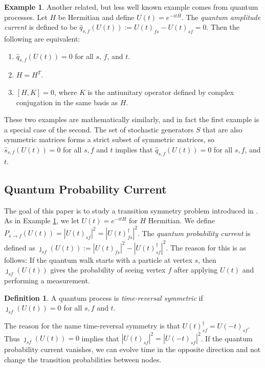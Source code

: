 \documentclass[twocolumn,superscriptaddress]{revtex4-1}
\theoremstyle{plain}
\theoremstyle{definition}
\newtheorem{defn}[theorem]{Definition}%
\theoremstyle{definition}
\theoremstyle{definition}
\theoremstyle{definition}
\newtheorem{example}[theorem]{Example}
\theoremstyle{definition}
\theoremstyle{definition}
\begin{document}
\begin{example}\label{ex:quantamp}
 Another related, but less well known example comes from quantum processes. Let $H$ be Hermitian and define $U(t)=e^{-itH}$. The \emph{quantum amplitude current} is defined to be $\hat{q}_{s,f}(U(t)):=U(t)_{fs}-U(t)_{sf}=0$. Then the following are equivalent:
 \begin{enumerate}
  \item $\hat{q}_{s,f}(U(t))=0$ for all $s$, $f$, and $t$.
  \item $H=H^T$.
  \item $[H,K]=0$, where $K$ is the antiunitary operator defined by complex conjugation in the same basis as $H$.
 \end{enumerate}

\end{example}


These two examples are mathematically similarly, and in fact the first example is a special case of the second. The set of stochastic generators $S$ that are also symmetric matrices forms a strict subset of symmetric matrices, so $\hat{s}_{s,f}(U(t))=0$ for  all $s,f$ and $t$ implies that $\hat{q}_{s,f}(U(t))=0$ for all $s,f$, and $t$. 



\subsection{Quantum Probability Current}

The goal of this paper is to study a transition symmetry problem introduced in \cite{Z13}. As in Example \ref{ex:quantamp}, we let $U(t)=e^{-itH}$ for $H$ Hermitian. We define $P_{s\to f}(U(t))=|U(t)_{sf}|^2=|U(t)_{fs}^\dagger|^2$. The \emph{quantum probability current} is defined as $\jmath_{sf}(U(t)):=|U(t)_{fs}|^2-|U(t)^\dagger_{sf}|^2$. The reason for this is as follows: If the quantum walk starts with a particle at vertex $s$, then $\jmath_{sf}(U(t))$ gives the probability of seeing vertex $f$ after applying $U(t)$ and performing a measurement.

\begin{defn}
 A quantum process is \emph{time-reversal symmetric} if $\jmath_{sf}(U(t))=0$ for all $s,f$ and $t$.
\end{defn}


 The reason for the name time-reversal symmetry is that $U(t)^\dagger_{sf}=U(-t)_{sf}$. Thus $\jmath_{sf}(U(t))=0$ implies that $|U(t)_{sf}|^2=|U(-t)_{sf}|^2$. If the quantum probability current vanishes, we can evolve time in the opposite direction and not change the transition probabilities between nodes.
\end{document}
